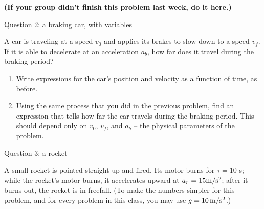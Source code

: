 \documentclass[12pt]{article}
\begin{document}
\vspace*{\fill}
\begin{center}
\bf (If your group didn't finish this problem last week, do it here.) 
\end{center}

\newpage

\centerline{\Large Question 2: a braking car, with variables}

A car is traveling at a speed $v_0$ and applies its brakes to slow down to a speed $v_f$. If it is able to decelerate at an acceleration $a_b$, how far does it travel during the braking period?

\begin{enumerate}
\item Write expressions for the car's position and velocity as a function of time, as before.

\vspace{1in}


\item Using the same process that you did in the previous problem, find an expression that tells how far the car travels during the braking period. This should depend only on $v_0$, $v_f$, and $a_b$ -- the physical parameters of the problem. 

\vspace{3in}

\end{enumerate}
\newpage

\centerline{\Large Question 3: a rocket}

A small rocket is pointed straight up and fired. Its motor burns for $\tau=10$ s; while the rocket's motor burns, it
accelerates upward at $a_r=15 \rm m/\rm s^2$; after it burns out, the rocket is in freefall. (To make the numbers simpler for 
this problem, and for every problem in this class, you may use $g=10\, \rm m/\rm s^2$.)
\end{document}
